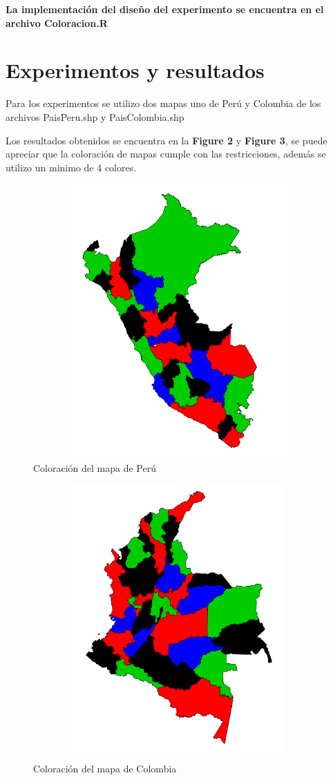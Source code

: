 \documentclass[a4paper]{article}
\begin{document}
\textbf{La implementación del diseño del experimento se encuentra en el archivo Coloracion.R}

\pagebreak
\section{Experimentos y resultados}

Para los experimentos se utilizo dos mapas uno de Perú y Colombia de los archivos PaisPeru.shp y PaisColombia.shp

Los resultados obtenidos se encuentra en la \textbf{Figure 2} y \textbf{Figure 3}, se puede apreciar que la coloración de mapas cumple con las restricciones, además se utilizo un minimo de 4 colores.



\begin{figure}
	\centering
	\includegraphics[width=12.5cm,height=10.5cm]{Peru.png}
	\caption{Coloración del mapa de Perú}
	\label{FI1_1}
\end{figure}

\begin{figure}
	\centering
	\includegraphics[width=12.5cm,height=10.5cm]{Colombia.png}
	\caption{Coloración del mapa de Colombia}
	\label{FI2_1}
\end{figure}
\end{document}
